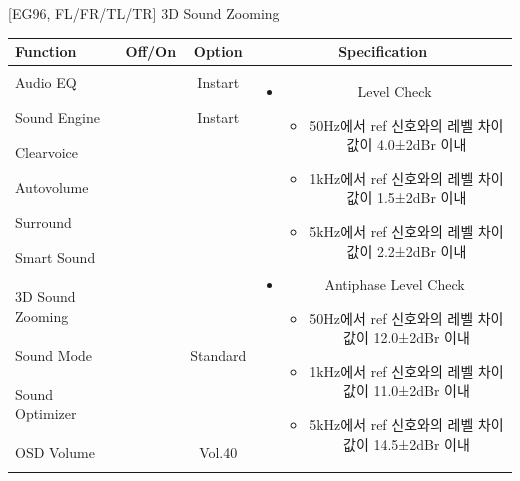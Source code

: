 \documentclass{beamer}
\begin{document}
\begin{frame}[t]{[EG96, FL/FR/TL/TR] 3D Sound Zooming}
\begin{tiny}
\begin{tabular}{@{}lccc@{}}
\toprule
Function & Off/On & Option & Specification \\
\midrule
Audio EQ & \color{black}{Off} & Instart &
\multirow{10}{60mm}{
\begin{itemize}
\item Level Check
	\begin{itemize}
	\item 50Hz에서 ref 신호와의 레벨 차이값이 4.0±2dBr 이내
	\item 1kHz에서 ref 신호와의 레벨 차이값이 1.5±2dBr 이내
	\item 5kHz에서 ref 신호와의 레벨 차이값이 2.2±2dBr 이내
	\end{itemize}
\item Antiphase Level Check
	\begin{itemize}	
	\item 50Hz에서 ref 신호와의 레벨 차이값이 12.0±2dBr 이내
	\item 1kHz에서 ref 신호와의 레벨 차이값이 11.0±2dBr 이내
	\item 5kHz에서 ref 신호와의 레벨 차이값이 14.5±2dBr 이내
	\end{itemize}
\end{itemize}
} \\
Sound Engine & \color{blue}{On} & Instart & \\
Clearvoice & \color{black}{Off} & & \\
Autovolume & \color{black}{Off} & & \\
Surround & \color{black}{Off} & & \\
Smart Sound & \color{black}{Off} & & \\
3D Sound Zooming & \color{blue}{On} & & \\
Sound Mode & \color{blue}{On} & Standard & \\
Sound Optimizer & \color{black}{Off} & & \\
OSD Volume & \color{blue}{On} & Vol.40 & \\
\midrule
\end{tabular}
\end{tiny}

\end{frame}
\end{document}
